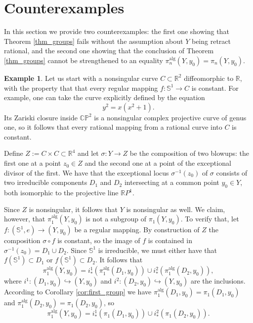 \documentclass{article}
\theoremstyle{plain}
\theoremstyle{definition}
\newtheorem{ex}[thm]{Example}
\theoremstyle{remark}
\newcommand{\R}{\mathbb{R}}
\newcommand{\s}{\mathbb{S}}
\newcommand{\alg}{\mathrm{alg}}
\begin{document}
\section{Counterexamples}
In this section we provide two counterexamples: the first one showing that Theorem \ref{thm_groups} fails without the assumption about $Y$ being retract rational, and the second one showing that the conclusion of Theorem \ref{thm_groups} cannot be strengthened to an equality $\pi_n^\alg(Y,y_0)=\pi_n(Y,y_0)$.
\begin{ex}\label{ex_1}
Let us start with a nonsingular curve $C\subset \R^2$ diffeomorphic to $\R$, with the property that that every regular mapping $f:\s^1\rightarrow C$ is constant. For example, one can take the curve explicitly defined by the equation
\begin{equation*}
    y^2=x(x^2+1).
\end{equation*}
Its Zariski closure inside $\mathbb C\mathbb P^2$ is a nonsingular complex projective curve of genus one, so it follows that every rational mapping from a rational curve into $C$ is constant.

Define $Z:=C\times C\subset \R^4$ and let $\sigma:Y\rightarrow Z$ be the composition of two blowups: the first one at a point $z_0\in Z$ and the second one at a point of the exceptional divisor of the first. We have that the exceptional locus $\sigma^{-1}(z_0)$ of $\sigma$ consists of two irreducible components $D_1$ and $D_2$ intersecting at a common point $y_0\in Y$, both isomorphic to the projective line $\R P^1$. 

Since $Z$ is nonsingular, it follows that $Y$ is nonsingular as well. We claim, however, that $\pi_1^\alg(Y,y_0)$ is not a subgroup of $\pi_1(Y,y_0)$. To verify that, let $f:(\s^1,e)\rightarrow (Y,y_0)$ be a regular mapping. By construction of $Z$ the composition $\sigma\circ f$ is constant, so the image of $f$ is contained in $\sigma^{-1}(z_0)=D_1\cup D_2$. Since $\s^1$ is irreducible, we must either have that $f(\s^1)\subset D_1$ or $f(\s^1)\subset D_2$. It follows that
\begin{equation*}
    \pi_1^\alg(Y,y_0)=i^1_\ast(\pi_1^\alg(D_1,y_0))\cup i^2_\ast(\pi_1^\alg(D_2,y_0)),
\end{equation*}
where $i^1:(D_1,y_0)\hookrightarrow (Y,y_0)$ and $i^2:(D_2,y_0)\hookrightarrow (Y,y_0)$ are the inclusions. According to Corollary \ref{cor:first_group} we have $\pi_1^\alg(D_1,y_0)=\pi_1(D_1,y_0)$ and $\pi_1^\alg(D_2,y_0)=\pi_1(D_2,y_0)$, so
\begin{equation*}
    \pi_1^\alg(Y,y_0)=i^1_\ast(\pi_1(D_1,y_0))\cup i^2_\ast(\pi_1(D_2,y_0)).
\end{equation*}


\end{ex}
\end{document}
